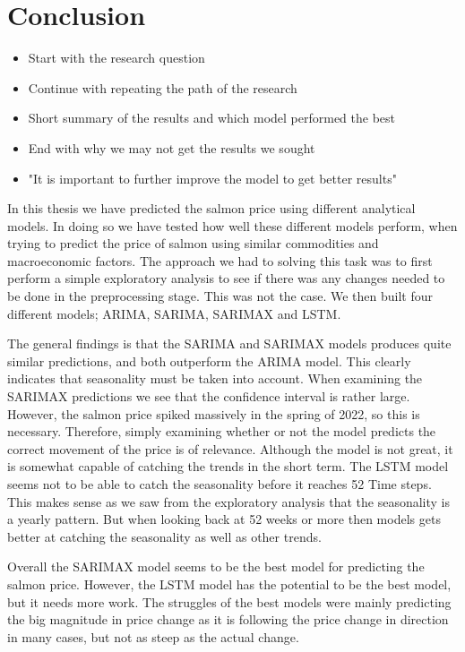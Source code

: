 \section{Conclusion}
\begin{itemize}
    \item Start with the research question
    \item Continue with repeating the path of the research
    \item Short summary of the results and which model performed the best
    \item End with why we may not get the results we sought
    \item "It is important to further improve the model to get better results"
\end{itemize}

In this thesis we have predicted the salmon price using different analytical models. In doing so we have tested how well these different models perform, when trying to predict the price of salmon using similar commodities and macroeconomic factors. The approach we had to solving this task was to first perform a simple exploratory analysis to see if there was any changes needed to be done in the preprocessing stage. This was not the case. We then built four different models; ARIMA, SARIMA, SARIMAX and LSTM.

The general findings is that the SARIMA and SARIMAX models produces quite similar predictions, and both outperform the ARIMA model. This clearly indicates that seasonality must be taken into account. When examining the SARIMAX predictions we see that the confidence interval is rather large. However, the salmon price spiked massively in the spring of 2022, so this is necessary. Therefore, simply examining whether or not the model predicts the correct movement of the price is of relevance. Although the model is not great, it is somewhat capable of catching the trends in the short term. The LSTM model seems not to be able to catch the seasonality before it reaches 52 Time steps. This makes sense as we saw from the exploratory analysis that the seasonality is a yearly pattern. But when looking back at 52 weeks or more then models gets better at catching the seasonality as well as other trends.

Overall the SARIMAX model seems to be the best model for predicting the salmon price. However, the LSTM model has the potential to be the best model, but it needs more work. The struggles of the best models were mainly predicting the big magnitude in price change as it is following the price change in direction in many cases, but not as steep as the actual change.
